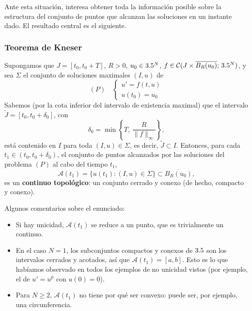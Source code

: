Ante esta situación, interesa obtener toda la información posible sobre la estructura del conjunto de puntos que alcanzan las soluciones en un instante dado. El resultado central es el siguiente.

\subsubsection{Teorema de Kneser}

\begin{teorema}
    Supongamos que $J = [t_0, t_0 + T]$, $R > 0$, $u_0 \in 3.5^N$, $f \in \mathcal{C}(J \times \overline{B_R(u_0)}; \, 3.5^N)$, y sea $\Sigma$ el conjunto de soluciones maximales $(I, u)$ de
    \[
        (P) \quad
        \begin{cases}
            u' = f(t, u) \\
            u(t_0) = u_0
        \end{cases}
    \]
    Sabemos (por la cota inferior del intervalo de existencia maximal) que el intervalo $\tilde{J} = [t_0, t_0 + \delta_0]$, con
    \[
        \delta_0 = \min \left\{ T, \, \frac{R}{\|f\|_\infty} \right\},
    \]
    está contenido en $I$ para toda $(I, u) \in \Sigma$, es decir, $\tilde{J} \subset I$. Entonces, para cada $t_1 \in (t_0, t_0 + \delta_0)$, el conjunto de puntos alcanzados por las soluciones del problema $(P)$ al cabo del tiempo $t_1$,
    \[
        \mathcal{A}(t_1) = \{ u(t_1) : (I, u) \in \Sigma \} \subset \overline{B_R(u_0)},
    \]
    es un \textbf{continuo topológico}: un conjunto cerrado y conexo (de hecho, compacto y conexo).
\end{teorema}

\begin{observación}
    Algunos comentarios sobre el enunciado:
    \begin{itemize}
        \item Si hay unicidad, $\mathcal{A}(t_1)$ se reduce a un punto, que es trivialmente un continuo.
        \item En el caso $N = 1$, los subconjuntos compactos y conexos de $3.5$ son los intervalos cerrados y acotados, así que $\mathcal{A}(t_1) = [a, b]$. Esto es lo que habíamos observado en todos los ejemplos de no unicidad vistos (por ejemplo, el de $u' = u^p$ con $u(0) = 0$).
        \item Para $N \geq 2$, $\mathcal{A}(t_1)$ no tiene por qué ser convexo: puede ser, por ejemplo, una circunferencia.
    \end{itemize}
\end{observación}

